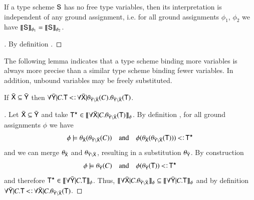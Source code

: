 \documentclass{report}
\begin{document}
  \begin{lemma}
    If a type scheme $\type{S}$ has no free type variables, then its interpretation is independent
    of any ground assignment, i.e. for all ground assignments $\phi_1$, $\phi_2$ we have
    $\interp{\phi_1}{\type{S}}=\interp{\phi_2}{\type{S}}$.
  \end{lemma}
  \begin{proof}[]
    By definition .
  \end{proof}
  The following lemma indicates that a type scheme binding more variables
  is always more precise than a similar type scheme binding fewer variables. In addition,
  unbound variables may be freely substituted. 
  \begin{lemma}
    If $\bar{\type{X}}\subseteq\bar{\type{Y}}$ then
    $\forall\bar{\type{Y}}|C.\type{T}\subtype\forall\bar{\type{X}}|\theta_{\bar{\type{Y}}\setminus\bar{\type{X}}}(C).\theta_{\bar{\type{Y}}\setminus\bar{\type{X}}}(\type{T})$.
  \end{lemma}
  \begin{proof}[]
    Let $\bar{\type{X}}\subseteq\bar{\type{Y}}$ and take
    $\type{T}^\star\in\sinterp{\forall\bar{\type{X}}|C.\theta_{\bar{\type{Y}}\setminus\bar{\type{X}}}(\type{T})}$. By definition , for all ground assignments $\phi$ we have
    \begin{displaymath}
      \phi\csat\theta_{\bar{\type{X}}}(\theta_{\bar{\type{Y}}\setminus\bar{\type{X}}}(C)) \quad\textrm{and}\quad
      \phi(\theta_{\bar{\type{X}}}(\theta_{\bar{\type{Y}}\setminus\bar{\type{X}}}(\type{T})))\subtype\type{T}^\star
    \end{displaymath}
    and we can merge $\theta_{\bar{\type{X}}}$ and
    $\theta_{\bar{\type{Y}}\setminus\bar{\type{X}}}$, resulting
    in a substitution $\theta_{\bar{\type{Y}}}$. By construction
    \begin{displaymath}
      \phi\csat\theta_{\bar{\type{Y}}}(C) \quad\textrm{and}\quad
      \phi(\theta_{\bar{\type{Y}}}(\type{T}))\subtype\type{T}^\star
    \end{displaymath}
    and therefore $\type{T}^\star\in\sinterp{\forall\bar{\type{Y}}|C.\type{T}}$.
    Thus, $\sinterp{\forall\bar{\type{X}}|C.\theta_{\bar{\type{Y}}\setminus\bar{\type{X}}}}\subseteq\sinterp{\forall\bar{\type{Y}}|C.\type{T}}$
    and by definition 
    $\forall\bar{\type{Y}}|C.\type{T}\subtype\forall\bar{\type{X}}|C.\theta_{\bar{\type{Y}}\setminus\bar{\type{X}}}(\type{T})$.
  \end{proof}
\end{document}
